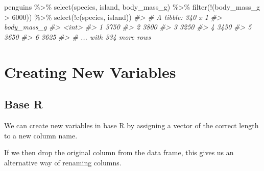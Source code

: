 \documentclass[
  12pt,
]{book}
\newenvironment{Shaded}{\begin{snugshade}}{\end{snugshade}}
\newcommand{\CommentTok}[1]{\textcolor[rgb]{0.56,0.35,0.01}{\textit{#1}}}
\newcommand{\DecValTok}[1]{\textcolor[rgb]{0.00,0.00,0.81}{#1}}
\newcommand{\FunctionTok}[1]{\textcolor[rgb]{0.00,0.00,0.00}{#1}}
\newcommand{\NormalTok}[1]{#1}
\newcommand{\OtherTok}[1]{\textcolor[rgb]{0.56,0.35,0.01}{#1}}
\newcommand{\SpecialCharTok}[1]{\textcolor[rgb]{0.00,0.00,0.00}{#1}}
\begin{document}
\begin{Shaded}
\begin{Highlighting}[]
\NormalTok{penguins }\SpecialCharTok{\%\textgreater{}\%} 
  \FunctionTok{select}\NormalTok{(species, island, body\_mass\_g) }\SpecialCharTok{\%\textgreater{}\%} 
  \FunctionTok{filter}\NormalTok{(}\SpecialCharTok{!}\NormalTok{(body\_mass\_g }\SpecialCharTok{\textgreater{}} \DecValTok{6000}\NormalTok{)) }\SpecialCharTok{\%\textgreater{}\%} 
  \FunctionTok{select}\NormalTok{(}\SpecialCharTok{!}\FunctionTok{c}\NormalTok{(species, island))}
\CommentTok{\#\textgreater{} \# A tibble: 340 x 1}
\CommentTok{\#\textgreater{}   body\_mass\_g}
\CommentTok{\#\textgreater{}         \textless{}int\textgreater{}}
\CommentTok{\#\textgreater{} 1        3750}
\CommentTok{\#\textgreater{} 2        3800}
\CommentTok{\#\textgreater{} 3        3250}
\CommentTok{\#\textgreater{} 4        3450}
\CommentTok{\#\textgreater{} 5        3650}
\CommentTok{\#\textgreater{} 6        3625}
\CommentTok{\#\textgreater{} \# ... with 334 more rows}
\end{Highlighting}
\end{Shaded}

\hypertarget{creating-new-variables}{%
\section{Creating New Variables}\label{creating-new-variables}}

\hypertarget{base-r-2}{%
\subsection{Base R}\label{base-r-2}}

We can create new variables in base R by assigning a vector of the correct length to a new column name.

\begin{Shaded}
\end{Shaded}

If we then drop the original column from the data frame, this gives us an alternative way of renaming columns.
\end{document}

